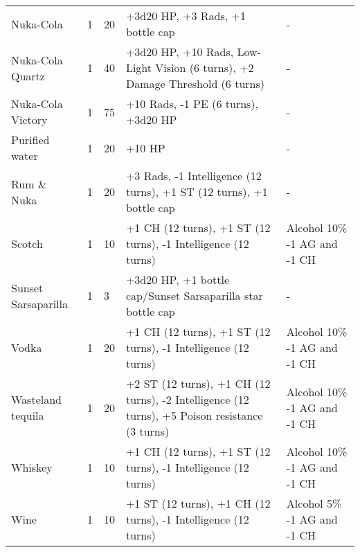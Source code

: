 \begin{longtable}{|p{4cm}|p{1.2cm}|p{1.2cm}|p{4cm}|p{4cm}|}
Nuka-Cola & 1 & 20 & +3d20 HP, +3 Rads, +1 bottle cap & - \\
Nuka-Cola Quartz & 1 & 40 & +3d20 HP, +10 Rads, Low-Light Vision (6 turns), +2 Damage Threshold (6 turns) & - \\
Nuka-Cola Victory & 1 & 75 & +10 Rads, -1 PE (6 turns), +3d20 HP & - \\
Purified water & 1 & 20 & +10 HP & - \\
Rum \& Nuka & 1 & 20 & +3 Rads, -1 Intelligence (12 turns), +1 ST (12 turns), +1 bottle cap & - \\
Scotch & 1 & 10 & +1 CH (12 turns), +1 ST (12 turns), -1 Intelligence (12 turns) & Alcohol 10\% -1 AG and -1 CH \\
Sunset Sarsaparilla & 1 & 3 & +3d20 HP, +1 bottle cap/Sunset Sarsaparilla star bottle cap & - \\
Vodka & 1 & 20 & +1 CH (12 turns), +1 ST (12 turns), -1 Intelligence (12 turns) & Alcohol 10\% -1 AG and -1 CH \\
Wasteland tequila & 1 & 20 & +2 ST (12 turns), +1 CH (12 turns), -2 Intelligence (12 turns), +5 Poison resistance (3 turns) & Alcohol 10\% -1 AG and -1 CH \\
Whiskey & 1 & 10 & +1 CH (12 turns), +1 ST (12 turns), -1 Intelligence (12 turns) & Alcohol 10\% -1 AG and -1 CH \\
Wine & 1 & 10 & +1 ST (12 turns), +1 CH (12 turns), -1 Intelligence (12 turns) & Alcohol 5\% -1 AG and -1 CH \\
\hline
\end{longtable}
